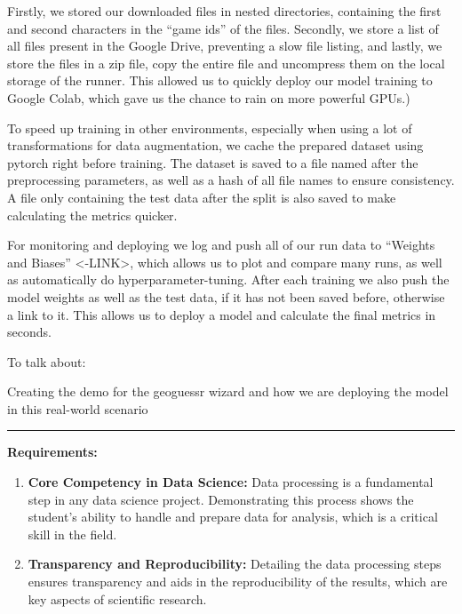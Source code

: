 \documentclass{article}
\providecommand{\tightlist}{%
  \setlength{\itemsep}{0pt}\setlength{\parskip}{0pt}}
\begin{document}
Firstly, we stored our downloaded files in nested directories,
containing the first and second characters in the ``game ids'' of the
files. Secondly, we store a list of all files present in the Google
Drive, preventing a slow file listing, and lastly, we store the files in
a zip file, copy the entire file and uncompress them on the local
storage of the runner. This allowed us to quickly deploy our model
training to Google Colab, which gave us the chance to rain on more
powerful GPUs.)

To speed up training in other environments, especially when using a lot
of transformations for data augmentation, we cache the prepared dataset
using pytorch right before training. The dataset is saved to a file
named after the preprocessing parameters, as well as a hash of all file
names to ensure consistency. A file only containing the test data after
the split is also saved to make calculating the metrics quicker.

For monitoring and deploying we log and push all of our run data to
``Weights and Biases'' \textless-LINK\textgreater, which allows us to
plot and compare many runs, as well as automatically do
hyperparameter-tuning. After each training we also push the model
weights as well as the test data, if it has not been saved before,
otherwise a link to it. This allows us to deploy a model and calculate
the final metrics in seconds.

To talk about:

Creating the demo for the geoguessr wizard and how we are deploying the
model in this real-world scenario

\begin{center}\rule{0.5\linewidth}{0.5pt}\end{center}

\textbf{Requirements:}

\begin{enumerate}
\def\labelenumi{\arabic{enumi}.}
\tightlist
\item
  \textbf{Core Competency in Data Science:} Data processing is a
  fundamental step in any data science project. Demonstrating this
  process shows the student's ability to handle and prepare data for
  analysis, which is a critical skill in the field.
\item
  \textbf{Transparency and Reproducibility:} Detailing the data
  processing steps ensures transparency and aids in the reproducibility
  of the results, which are key aspects of scientific research.
\end{enumerate}
\end{document}
